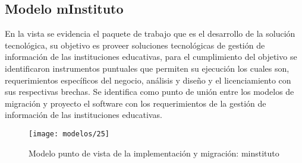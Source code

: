   \subsection{Modelo mInstituto}
  En la vista se evidencia el paquete de trabajo que es el desarrollo de la solución tecnológica, su objetivo es proveer soluciones tecnológicas de gestión de información de las instituciones educativas, para el cumplimiento del objetivo se identificaron instrumentos puntuales que permiten su ejecución los cuales son, requerimientos específicos del negocio, análisis y diseño y el licenciamiento con sus respectivas brechas.  Se identifica como punto de unión entre los modelos de migración y proyecto el software con los requerimientos de la gestión de información de las instituciones educativas.
  
  \begin{figure}[H]
	\centering
	\texttt{[image: modelos/25]}
	\captionsetup{width=.95\textwidth}
	\caption{Modelo punto de vista de la implementación y migración: minstituto}
	\label{modelo25}
  \end{figure}